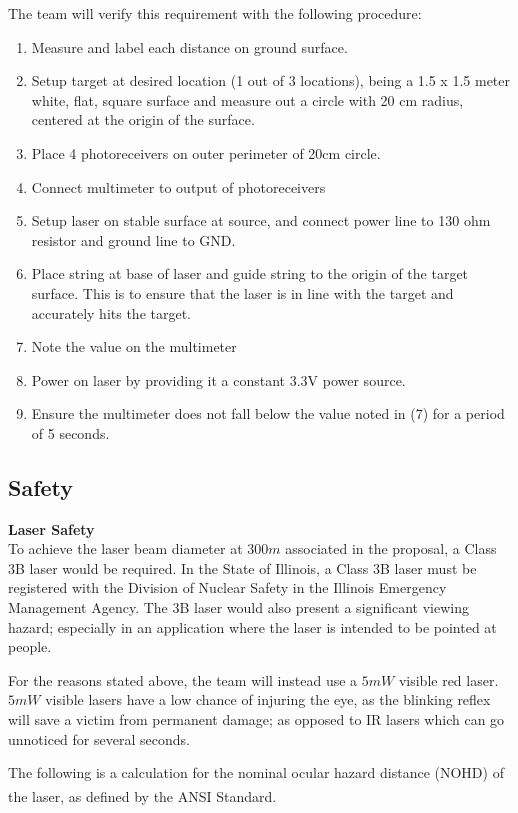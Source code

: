 \documentclass[letterpaper,10pt]{article}
\begin{document}
\begin{spacing}{1.15}
The team will verify this requirement with the following procedure:

\begin{enumerate}
	\item Measure and label each distance on ground surface.
	\item Setup target at desired location (1 out of 3 locations), being a 1.5 x 1.5 meter white, flat, square surface and measure out a circle with 20 cm radius, centered at the origin of the surface.
	\item Place 4 photoreceivers on outer perimeter of 20cm circle.
	\item Connect multimeter to output of photoreceivers
	\item Setup laser on stable surface at source, and connect power line to 130 ohm resistor and ground line to GND.
	\item Place string at base of laser and guide string to the origin of the target surface. This is to ensure that the laser is in line with the target and accurately hits the target.
	\item Note the value on the multimeter
	\item Power on laser by providing it a constant 3.3V power source.
	\item Ensure the multimeter does not fall below the value noted in (7) for a period of 5 seconds. 
\end{enumerate}

\subsection{Safety} \label{section-safety-ethics}
\normalsize\textbf{Laser Safety} \\
To achieve the laser beam diameter at $300 m$ associated in the proposal, a Class 3B laser would be required. In the State of Illinois, a Class 3B laser must be registered with the Division of Nuclear Safety in the Illinois Emergency Management Agency. The 3B laser would also present a significant viewing hazard; especially in an application where the laser is intended to be pointed at people. 

For the reasons stated above, the team will instead use a $5mW$ visible red laser. $5mW$ visible lasers have a low chance of injuring the eye, as the blinking reflex will save a victim from permanent damage; as opposed to IR lasers which can go unnoticed for several seconds. 

The following is a calculation for the nominal ocular hazard distance (NOHD) of the laser, as defined by the ANSI Standard\textsuperscript{\cite{ANSI}}.


\end{spacing}
\end{document}
